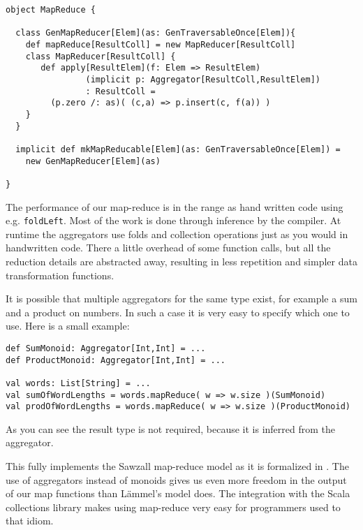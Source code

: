 \documentclass[10pt,a4paper]{article}
\begin{document}
\begin{lstlisting}[float,frame=tb,caption=MapReduce for Scala collections,label=lst:map-reduce]
object MapReduce {

  class GenMapReducer[Elem](as: GenTraversableOnce[Elem]){
    def mapReduce[ResultColl] = new MapReducer[ResultColl]
    class MapReducer[ResultColl] {
       def apply[ResultElem](f: Elem => ResultElem)
                (implicit p: Aggregator[ResultColl,ResultElem])
                : ResultColl =
  	     (p.zero /: as)( (c,a) => p.insert(c, f(a)) )
    }
  }

  implicit def mkMapReducable[Elem](as: GenTraversableOnce[Elem]) =
    new GenMapReducer[Elem](as)

}
\end{lstlisting}

The performance of our map-reduce is in the range as hand written code using e.g. \lstinline|foldLeft|. Most of the work is done through inference by the compiler. At runtime the aggregators use folds and collection operations just as you would in handwritten code. There a little overhead of some function calls, but all the reduction details are abstracted away, resulting in less repetition and simpler data transformation functions.

It is possible that multiple aggregators for the same type exist, for example a sum and a product on numbers. In such a case it is very easy to specify which one to use. Here is a small example:
\begin{lstlisting}
def SumMonoid: Aggregator[Int,Int] = ...
def ProductMonoid: Aggregator[Int,Int] = ...

val words: List[String] = ...
val sumOfWordLengths = words.mapReduce( w => w.size )(SumMonoid)
val prodOfWordLengths = words.mapReduce( w => w.size )(ProductMonoid)
\end{lstlisting}
As you can see the result type is not required, because it is inferred from the aggregator.

This fully implements the Sawzall map-reduce model as it is formalized in \cite{lammel2008google}. The use of aggregators instead of monoids gives us even more freedom in the output of our map functions than L\"ammel's model does. The integration with the Scala collections library makes using map-reduce very easy for programmers used to that idiom.



\end{document}
